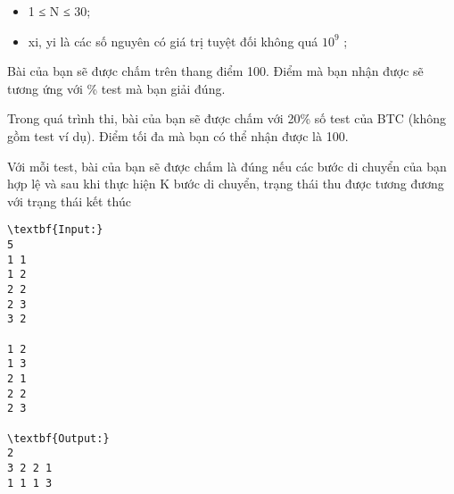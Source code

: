 \begin{itemize}
	\item     1 ≤ N ≤ 30;   
	\item     xi, yi là các số nguyên có giá trị tuyệt đối không quá $10^{9}$    ;   
\end{itemize}
Bài của bạn sẽ được chấm trên thang điểm 100. Điểm mà bạn nhận được sẽ tương ứng với \% test mà bạn giải đúng.  

   Trong quá trình thi, bài của bạn sẽ được chấm với 20\% số test của BTC (không gồm test ví dụ). Điểm tối đa mà bạn có thể nhận được là 100.  

   Với mỗi test, bài của bạn sẽ được chấm là đúng nếu các bước di chuyển của bạn hợp lệ và sau khi thực hiện K bước di chuyển, trạng thái thu được tương đương với trạng thái kết thúc
\begin{verbatim}
\textbf{Input:}
5
1 1
1 2
2 2
2 3
3 2

1 2
1 3
2 1
2 2
2 3

\textbf{Output:}
2
3 2 2 1
1 1 1 3
\end{verbatim}
